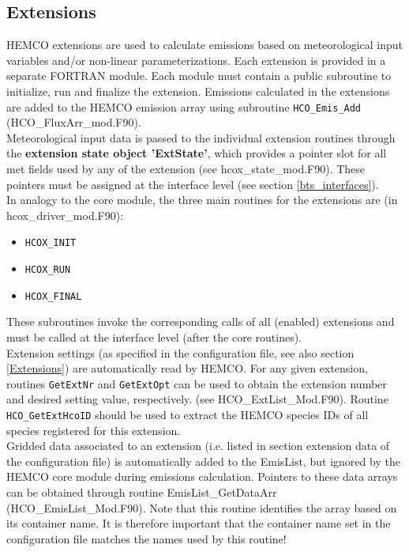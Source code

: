 \documentclass[12pt,a4paper]{article} %
\begin{document}
\subsection{Extensions} \label{bts_extensions}
HEMCO extensions are used to calculate emissions based on meteorological input variables and/or non-linear parameterizations. Each extension is provided in a separate FORTRAN module. Each module must contain a public subroutine to initialize, run and finalize the extension. Emissions calculated in the extensions are added to the HEMCO emission array using subroutine \texttt{HCO\_Emis\_Add} (HCO\_FluxArr\_mod.F90).\\
Meteorological input data is passed to the individual extension routines through the \textbf{extension state object 'ExtState'}, which provides a pointer slot for all met fields used by any of the extension (see hcox\_state\_mod.F90). These pointers must be assigned at the interface level (see section \ref{bts_interfaces}).\\
In analogy to the core module, the three main routines for the extensions are (in hcox\_driver\_mod.F90):
\begin{itemize}
\item \texttt{HCOX\_INIT}
\item \texttt{HCOX\_RUN}
\item \texttt{HCOX\_FINAL}
\end{itemize}
These subroutines invoke the corresponding calls of all (enabled) extensions and must be called at the interface level (after the core routines).\\
Extension settings (as specified in the configuration file, see also section \ref{Extensions}) are automatically read by HEMCO. For any given extension, routines \texttt{GetExtNr} and \texttt{GetExtOpt} can be used to obtain the extension number and desired setting value, respectively. (see HCO\_ExtList\_Mod.F90). Routine \texttt{HCO\_GetExtHcoID} should be used to extract the HEMCO species IDs of all species registered for this extension.\\
Gridded data associated to an extension (i.e. listed in section extension data of the configuration file) is automatically added to the EmisList, but ignored by the HEMCO core module during emissions calculation. Pointers to these data arrays can be obtained through routine EmisList\_GetDataArr (HCO\_EmisList\_Mod.F90). Note that this routine identifies the array based on its container name. It is therefore important that the container name set in the configuration file matches the names used by this routine!
\end{document}
